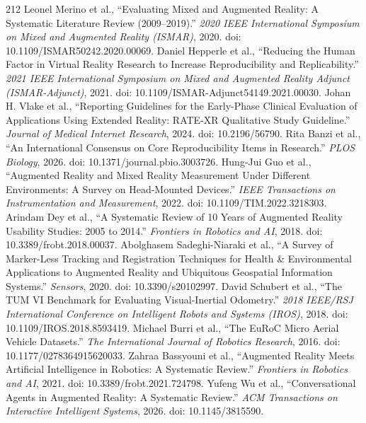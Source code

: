 \begin{thebibliography}{212}
 Leonel Merino et al., ``Evaluating Mixed and Augmented Reality: A Systematic Literature Review (2009--2019).'' \emph{2020 IEEE International Symposium on Mixed and Augmented Reality (ISMAR)}, 2020. doi: 10.1109/ISMAR50242.2020.00069.
 Daniel Hepperle et al., ``Reducing the Human Factor in Virtual Reality Research to Increase Reproducibility and Replicability.'' \emph{2021 IEEE International Symposium on Mixed and Augmented Reality Adjunct (ISMAR-Adjunct)}, 2021. doi: 10.1109/ISMAR-Adjunct54149.2021.00030.
 Johan H. Vlake et al., ``Reporting Guidelines for the Early-Phase Clinical Evaluation of Applications Using Extended Reality: {RATE-XR} Qualitative Study Guideline.'' \emph{Journal of Medical Internet Research}, 2024. doi: 10.2196/56790.
 Rita Banzi et al., ``An International Consensus on Core Reproducibility Items in Research.'' \emph{PLOS Biology}, 2026. doi: 10.1371/journal.pbio.3003726.
 Hung-Jui Guo et al., ``Augmented Reality and Mixed Reality Measurement Under Different Environments: A Survey on Head-Mounted Devices.'' \emph{IEEE Transactions on Instrumentation and Measurement}, 2022. doi: 10.1109/TIM.2022.3218303.
 Arindam Dey et al., ``A Systematic Review of 10 Years of Augmented Reality Usability Studies: 2005 to 2014.'' \emph{Frontiers in Robotics and AI}, 2018. doi: 10.3389/frobt.2018.00037.
 Abolghasem Sadeghi-Niaraki et al., ``A Survey of Marker-Less Tracking and Registration Techniques for Health \& Environmental Applications to Augmented Reality and Ubiquitous Geospatial Information Systems.'' \emph{Sensors}, 2020. doi: 10.3390/s20102997.
 David Schubert et al., ``The {TUM VI} Benchmark for Evaluating Visual-Inertial Odometry.'' \emph{2018 IEEE/RSJ International Conference on Intelligent Robots and Systems (IROS)}, 2018. doi: 10.1109/IROS.2018.8593419.
 Michael Burri et al., ``The {EuRoC} Micro Aerial Vehicle Datasets.'' \emph{The International Journal of Robotics Research}, 2016. doi: 10.1177/0278364915620033.
 Zahraa Bassyouni et al., ``Augmented Reality Meets Artificial Intelligence in Robotics: A Systematic Review.'' \emph{Frontiers in Robotics and AI}, 2021. doi: 10.3389/frobt.2021.724798.
 Yufeng Wu et al., ``Conversational Agents in Augmented Reality: A Systematic Review.'' \emph{ACM Transactions on Interactive Intelligent Systems}, 2026. doi: 10.1145/3815590.

\end{thebibliography}
